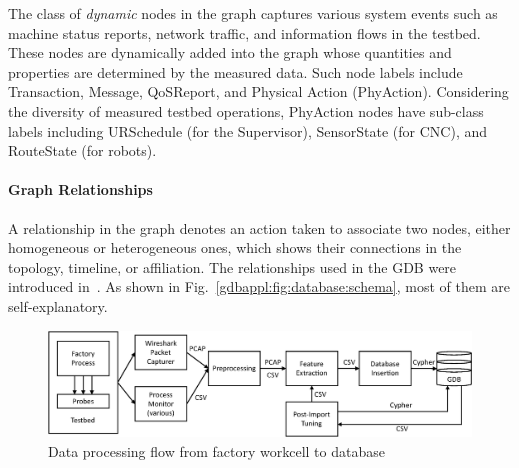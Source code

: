 The class of \textit{dynamic} nodes in the graph captures various system events such as machine status reports, network traffic, and information flows in the testbed. These nodes are dynamically added into the graph whose quantities and properties are determined by the measured data. Such node labels include Transaction, Message, QoSReport, and Physical Action (PhyAction). Considering the diversity of measured testbed operations, PhyAction nodes have sub-class labels including URSchedule (for the Supervisor), SensorState (for CNC), and RouteState (for robots).


\paragraph{Graph Relationships}

A relationship in the graph denotes an action taken to associate two nodes, either homogeneous or heterogeneous ones, which shows their connections in the topology, timeline, or affiliation. The relationships used in the GDB were introduced in~\cite{CandellISIT2020.Conf}. As shown in Fig.~\ref{gdbappl:fig:database:schema}, most of them are self-explanatory. 

\begin{figure}
	\centering
	\includegraphics[width=\textwidth]{chapter-gdb-appl/figures/info_workflow_tii.eps}
	\caption{Data processing flow from factory workcell to database}
	\label{gdbappl:fig:database:work-flow}
\end{figure}

